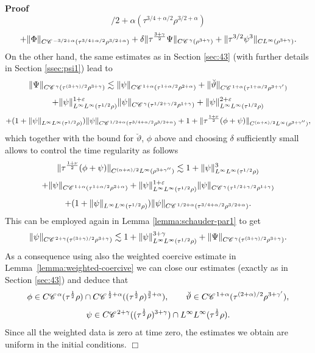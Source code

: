 \documentclass[a4paper,11pt]{article}
\newenvironment{proof}{\noindent\textbf{Proof\ }}{\hspace*{\fill}$\Box$\medskip}
\numberwithin{equation}{section}
\newcommand{\CC}{\mathscr{C} \hspace{.1em}}
\newcommand{\rmbb}[1]{\textcolor{black}{#1}}
\newcommand{\8}{\infty}
\begin{document}
\begin{proof}
\[{{     / 2 + \alpha} (\tau^{3 / 4 + \alpha / 2} \rho^{3 / 2 + \alpha})}  \]
  \[ + \| \Phi \|_{C \CC^{- 3 / 2 + \alpha} (\tau^{3 / 4 + \alpha / 2} \rho^{3
     / 2 + \alpha})} +\delta \| \tau^{\frac{3 + \gamma}{2}} \Psi \|_{C
     \CC^{\gamma} ( \rho^{3 + \gamma})}+\rmbb{\| \tau^{3/2  
     }  \psi^{3} \|_{C L^{\infty}
     (\rho^{3 + \gamma})} } .
\]
On the other hand, the same estimates as in Section \ref{sec:43} (with further details in Section \ref{ssec:psi1}) lead to
  \[ \| \Psi \|_{C \CC^{\gamma} (\tau^{(3 + \gamma) / 2} \rho^{3 + \gamma})}
     \lesssim \| \psi \|_{C \CC^{1 + \alpha} (\tau^{1 + \alpha / 2} \rho^{2 +
     \alpha})} + \| \breve{\vartheta} \|_{C \CC^{1 + \alpha} (\tau^{1 + \alpha
     / 2} \rho^{3 +\gamma'})} \]
  \[ + \| \psi \|_{L^{\infty} L^{\infty} (\tau^{1 / 2} \rho)}^{1 +
     \varepsilon} \| \psi \|_{C \CC^{\gamma} (\tau^{1 / 2 + \gamma / 2}
     \rho^{1 + \gamma})} + \| \psi \|_{L^{\infty} L^{\infty} (\tau^{1 / 2}
     \rho)}^{2 + \varepsilon} \]
  \[ + (1 + \| \psi \|_{L^{\infty} L^{\infty} (\tau^{1 / 2} \rho)}) \| \psi
     \|_{C \CC^{1 / 2 + \alpha} (\tau^{3 / 4 + \alpha / 2} \rho^{3 / 2 +
     \alpha})} + 1 + \| \tau^{\frac{1 + \nu}{2}} (\phi + \psi) \|_{C^{(\alpha + \kappa) / 2}
     L^{\infty} (\rho^{3 + \gamma''})},\]
  which together with the bound for $\breve{\vartheta}$, $\phi$ above and choosing $\delta$ sufficiently small allows to control the time regularity as follows
\[ \| \tau^{\frac{1 + \nu}{2}} (\phi + \psi) \|_{C^{(\alpha + \kappa) / 2}
     L^{\infty} (\rho^{3 + \gamma''})} \lesssim 1+ \|
      \psi \|^{\rmbb{3}}_{L^{\infty} L^{\infty} (\tau^{1 / 2} \rho)}  \]
  \[+ \| \psi \|_{C \CC^{1 + \alpha} (\tau^{1 + \alpha / 2} \rho^{2 +
     \alpha})}  + \| \psi \|_{L^{\infty} L^{\infty} (\tau^{1 / 2} \rho)}^{1 +
     \varepsilon} \| \psi \|_{C \CC^{\gamma} (\tau^{1 / 2 + \gamma / 2}
     \rho^{1 + \gamma})} \]
  \[ + (1 + \| \psi \|_{L^{\infty} L^{\infty} (\tau^{1 / 2} \rho)}) \| \psi
     \|_{C \CC^{1 / 2 + \alpha} (\tau^{3 / 4 + \alpha / 2} \rho^{3 / 2 +
     \alpha})}.\]
This
  can be employed again in Lemma \ref{lemma:schauder-par1} to get
  \[ \| \psi \|_{C \CC^{2 + \gamma} (\tau^{(3 + \gamma) / 2} \rho^{3 +
     \gamma})} \lesssim 1+ \| \psi \|^{3+\gamma}_{L^{\infty} L^{\infty} (\tau^{1 / 2} \rho)}
     + \| \Psi \|_{C \CC^{\gamma_{}} (\tau^{(3 + \gamma) / 2} \rho^{3 +
     \gamma})} . \]
  As a consequence using also the weighted coercive estimate in
  Lemma~\ref{lemma:weighted-coercive} we can close our estimates (exactly as
  in Section \ref{sec:43}) and deduce that
  \[ \phi \in C \CC^{\alpha} (\tau^{\frac{1}{2}} \rho) \cap C \CC^{\frac{1}{2}
     + \alpha} ((\tau^{\frac{1}{2}} \rho)^{\frac{3}{2} + \alpha}), \qquad
     \breve{\vartheta} \in C \CC^{1 + \alpha}_{} (\tau^{(2 + \alpha) / 2}
     \rho_{}^{3 + \gamma'}), \]
  \[ \psi \in C \CC^{2 + \gamma} ((\tau^{\frac{1}{2}} \rho)^{3 + \gamma})  \cap
     L^{\infty} L^{\infty} (\tau^{\frac{1}{2}} \rho) . \]
  Since all the weighted data is zero at time zero, the estimates we obtain
  are uniform in the initial conditions.
\end{proof}
\end{document}
